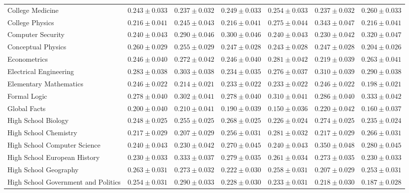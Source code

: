 \documentclass[11pt]{article}
\begin{document}
{\begin{landscape}
\begin{table}
\begin{tabular}{l c c c c c c }
College Medicine & $0.243 \pm 0.033$ & $0.237 \pm 0.032$ & $0.249 \pm 0.033$ & $0.254 \pm 0.033$ & $0.237 \pm 0.032$ & $0.260 \pm 0.033$ \\ 
College Physics & $0.216 \pm 0.041$ & $0.245 \pm 0.043$ & $0.216 \pm 0.041$ & $0.275 \pm 0.044$ & $0.343 \pm 0.047$ & $0.216 \pm 0.041$ \\ 
Computer Security & $0.240 \pm 0.043$ & $0.290 \pm 0.046$ & $0.300 \pm 0.046$ & $0.240 \pm 0.043$ & $0.230 \pm 0.042$ & $0.320 \pm 0.047$ \\ 
Conceptual Physics & $0.260 \pm 0.029$ & $0.255 \pm 0.029$ & $0.247 \pm 0.028$ & $0.243 \pm 0.028$ & $0.247 \pm 0.028$ & $0.204 \pm 0.026$ \\ 
Econometrics & $0.246 \pm 0.040$ & $0.272 \pm 0.042$ & $0.246 \pm 0.040$ & $0.281 \pm 0.042$ & $0.219 \pm 0.039$ & $0.263 \pm 0.041$ \\ 
Electrical Engineering & $0.283 \pm 0.038$ & $0.303 \pm 0.038$ & $0.234 \pm 0.035$ & $0.276 \pm 0.037$ & $0.310 \pm 0.039$ & $0.290 \pm 0.038$ \\ 
Elementary Mathematics & $0.246 \pm 0.022$ & $0.214 \pm 0.021$ & $0.233 \pm 0.022$ & $0.233 \pm 0.022$ & $0.246 \pm 0.022$ & $0.198 \pm 0.021$ \\ 
Formal Logic & $0.278 \pm 0.040$ & $0.302 \pm 0.041$ & $0.278 \pm 0.040$ & $0.310 \pm 0.041$ & $0.286 \pm 0.040$ & $0.333 \pm 0.042$ \\ 
Global Facts & $0.200 \pm 0.040$ & $0.210 \pm 0.041$ & $0.190 \pm 0.039$ & $0.150 \pm 0.036$ & $0.220 \pm 0.042$ & $0.160 \pm 0.037$ \\ 
High School Biology & $0.248 \pm 0.025$ & $0.255 \pm 0.025$ & $0.268 \pm 0.025$ & $0.226 \pm 0.024$ & $0.274 \pm 0.025$ & $0.235 \pm 0.024$ \\ 
High School Chemistry & $0.217 \pm 0.029$ & $0.207 \pm 0.029$ & $0.256 \pm 0.031$ & $0.281 \pm 0.032$ & $0.217 \pm 0.029$ & $0.266 \pm 0.031$ \\ 
High School Computer Science & $0.240 \pm 0.043$ & $0.230 \pm 0.042$ & $0.270 \pm 0.045$ & $0.240 \pm 0.043$ & $0.350 \pm 0.048$ & $0.280 \pm 0.045$ \\ 
High School European History & $0.230 \pm 0.033$ & $0.333 \pm 0.037$ & $0.279 \pm 0.035$ & $0.261 \pm 0.034$ & $0.273 \pm 0.035$ & $0.230 \pm 0.033$ \\ 
High School Geography & $0.263 \pm 0.031$ & $0.273 \pm 0.032$ & $0.222 \pm 0.030$ & $0.258 \pm 0.031$ & $0.207 \pm 0.029$ & $0.253 \pm 0.031$ \\ 
High School Government and Politics & $0.254 \pm 0.031$ & $0.290 \pm 0.033$ & $0.228 \pm 0.030$ & $0.233 \pm 0.031$ & $0.218 \pm 0.030$ & $0.187 \pm 0.028$ \\ 

\end{tabular}
\end{table}
\end{landscape}}
\end{document}

